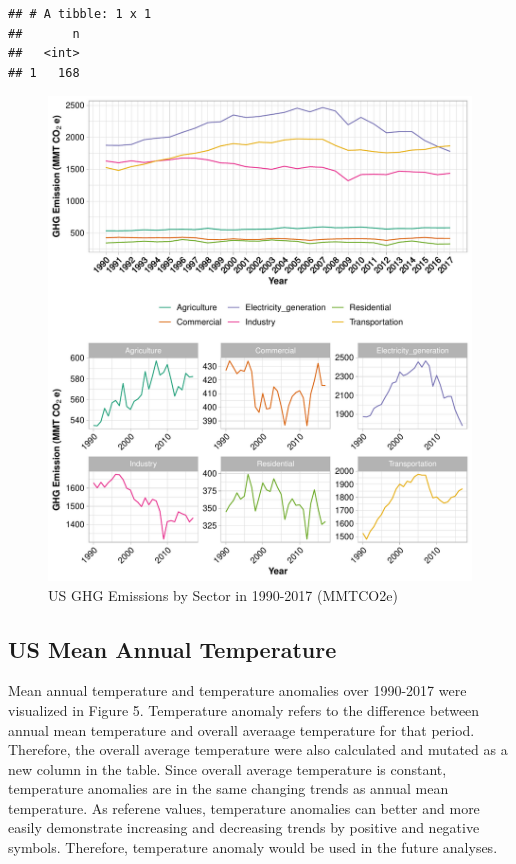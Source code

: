 \documentclass[12pt,]{article}
\begin{document}
\begin{verbatim}
## # A tibble: 1 x 1
##       n
##   <int>
## 1   168
\end{verbatim}

\begin{figure}
\centering
\includegraphics{Project_Code_files/figure-latex/unnamed-chunk-10-1.pdf}
\caption{US GHG Emissions by Sector in 1990-2017 (MMTCO2e)}
\end{figure}

\newpage

\subsection{US Mean Annual
Temperature}\label{us-mean-annual-temperature}

Mean annual temperature and temperature anomalies over 1990-2017 were
visualized in Figure 5. Temperature anomaly refers to the difference
between annual mean temperature and overall averaage temperature for
that period. Therefore, the overall average temperature were also
calculated and mutated as a new column in the table. Since overall
average temperature is constant, temperature anomalies are in the same
changing trends as annual mean temperature. As referene values,
temperature anomalies can better and more easily demonstrate increasing
and decreasing trends by positive and negative symbols. Therefore,
temperature anomaly would be used in the future analyses.
\end{document}
